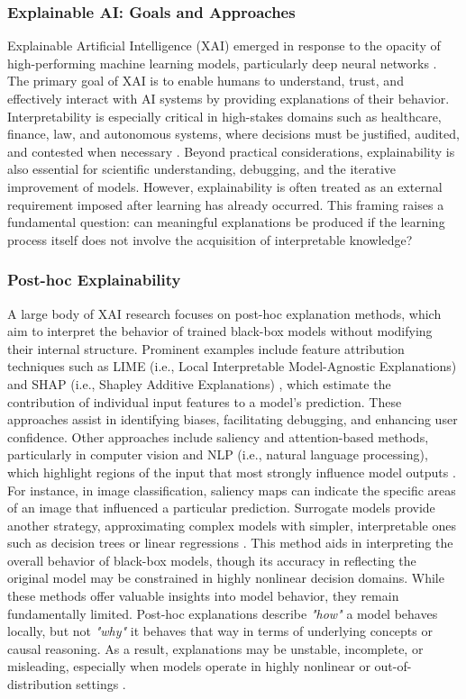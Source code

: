 \documentclass[12pt,a4paper]{report}
\begin{document}
\subsubsection{Explainable AI: Goals and Approaches}
Explainable Artificial Intelligence (XAI) emerged in response to the opacity of high-performing machine learning models, particularly deep neural networks \cite{chiave5}. The primary goal of XAI is to enable humans to understand, trust, and effectively interact with AI systems by providing explanations of their behavior.
Interpretability is especially critical in high-stakes domains such as healthcare, finance, law, and autonomous systems, where decisions must be justified, audited, and contested when necessary \cite{chiave19}. Beyond practical considerations, explainability is also essential for scientific understanding, debugging, and the iterative improvement of models.
However, explainability is often treated as an external requirement imposed after learning has already occurred. This framing raises a fundamental question: can meaningful explanations be produced if the learning process itself does not involve the acquisition of interpretable knowledge?

\subsubsection{Post-hoc Explainability}
A large body of XAI research focuses on post-hoc explanation methods, which aim to interpret the behavior of trained black-box models without modifying their internal structure. Prominent examples include feature attribution techniques such as LIME (i.e., Local Interpretable Model-Agnostic Explanations) \cite{chiave20} and SHAP (i.e., Shapley Additive Explanations) \cite{chiave21}, which estimate the contribution of individual input features to a model's prediction. These approaches assist in identifying biases, facilitating debugging, and enhancing user confidence.
Other approaches include saliency and attention-based methods, particularly in computer vision and NLP (i.e., natural language processing), which highlight regions of the input that most strongly influence model outputs \cite{chiave22}. For instance, in image classification, saliency maps can indicate the specific areas of an image that influenced a particular prediction.
Surrogate models provide another strategy, approximating complex models with simpler, interpretable ones such as decision trees or linear regressions \cite{chiave23}. This method aids in interpreting the overall behavior of black-box models, though its accuracy in reflecting the original model may be constrained in highly nonlinear decision domains.
While these methods offer valuable insights into model behavior, they remain fundamentally limited. Post-hoc explanations describe \textit{"how"} a model behaves locally, but not \textit{"why"} it behaves that way in terms of underlying concepts or causal reasoning. As a result, explanations may be unstable, incomplete, or misleading, especially when models operate in highly nonlinear or out-of-distribution settings \cite{chiave24}.
\end{document}
